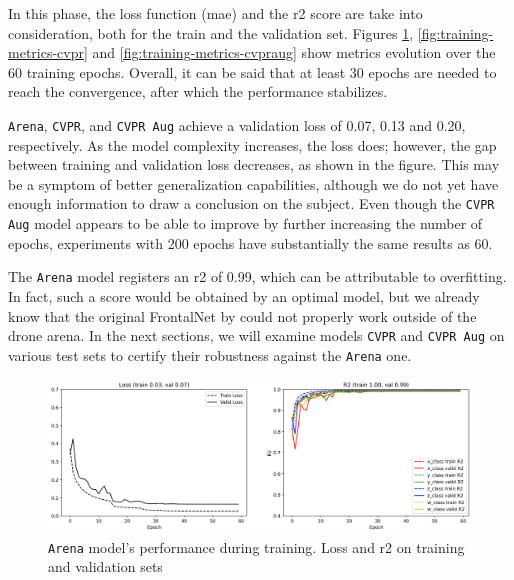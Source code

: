 In this phase, the loss function (\gls{mae}) and the \gls{r2} score are take into consideration, both for the train and the validation set. Figures \ref{fig:training-metrics-arena}, \ref{fig:training-metrics-cvpr} and \ref{fig:training-metrics-cvpraug} show metrics evolution over the 60 training epochs. Overall, it can be said that at least 30 epochs are needed to reach the convergence, after which the performance stabilizes.

\texttt{Arena}, \texttt{CVPR}, and \texttt{CVPR Aug} achieve a validation loss of 0.07, 0.13 and 0.20, respectively. As the model complexity increases, the loss does; however, the gap between training and validation loss decreases, as shown in the figure. This may be a symptom of better generalization capabilities, although we do not yet have enough information to draw a conclusion on the subject. Even though the \texttt{CVPR Aug} model appears to be able to improve by further increasing the number of epochs, experiments with 200 epochs have substantially the same results as 60.

The \texttt{Arena} model registers an \gls{r2} of 0.99, which can be attributable to overfitting. In fact, such a score would be obtained by an optimal model, but we already know that the original FrontalNet by \cite{mantegazza2019visionbased} could not properly work outside of the drone arena. In the next sections, we will examine models \texttt{CVPR} and \texttt{CVPR Aug} on various test sets to certify their robustness against the \texttt{Arena} one.

\begin{figure}[H]
	\centering
	\includegraphics[width=1 \textwidth]{"contents/images/06-training-arena"}
	\caption[\texttt{Arena} model's performance during training. Loss and \gls{r2} on training and validation sets]{\texttt{Arena} model's performance during training. Loss and \gls{r2} on training and validation sets}
	\label{fig:training-metrics-arena}
\end{figure}


